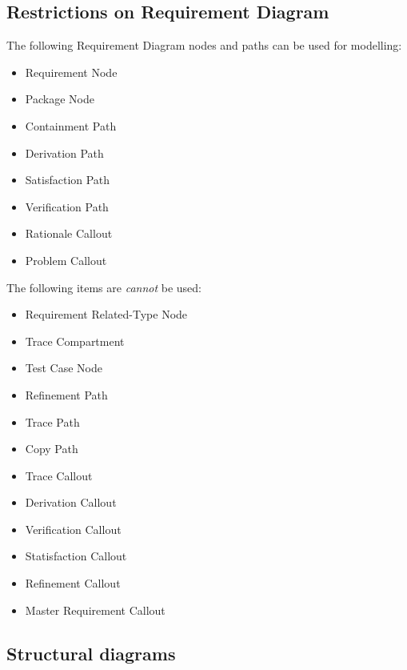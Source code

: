 \subsection{Restrictions on Requirement Diagram}

The following Requirement Diagram nodes and paths can be used for
modelling:
\begin{itemize}
\item Requirement Node
\item Package Node
\item Containment Path
\item Derivation Path
\item Satisfaction Path
\item Verification Path
\item Rationale Callout
\item Problem Callout
\end{itemize}

The following items are \emph{cannot} be used:
\begin{itemize}
\item Requirement Related-Type Node
\item Trace Compartment
\item Test Case Node
\item Refinement Path
\item Trace Path
\item Copy Path
\item Trace Callout
\item Derivation Callout
\item Verification Callout
\item Statisfaction Callout
\item Refinement Callout
\item Master Requirement Callout
\end{itemize}

\subsection{Structural  diagrams}

\begin{comment}
Why ? When ? How ?

First ideas :

  	\begin{itemize}
  		\item package 
  		\item BDD 
  		\item IBD 
  		 	\begin{itemize}
  				\item requirement
  				\item ... ?
			\end{itemize}  	
  		\item parameters 
	\end{itemize}  	    


\end{comment}


